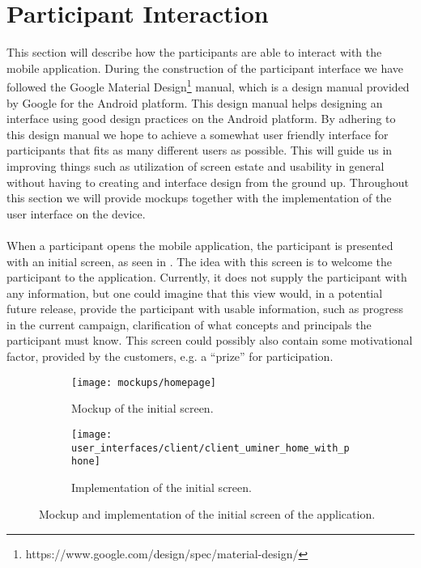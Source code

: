 
\section{Participant Interaction}
\label{sec:participant_interaction}
This section will describe how the participants are able to interact with the mobile application. During the construction of the participant interface we have followed the Google Material Design\footnote{https://www.google.com/design/spec/material-design/} manual, which is a design manual provided by Google for the Android platform. This design manual helps designing an interface using good design practices on the Android platform. By adhering to this design manual we hope to achieve a somewhat user friendly interface for participants that fits as many different users as possible. This will guide us in improving things such as utilization of screen estate and usability in general without having to creating and interface design from the ground up. Throughout this section we will provide mockups together with the implementation of the user interface on the device.
\\\\
When a participant opens the mobile application, the participant is presented with an initial screen, as seen in . The idea with this screen is to welcome the participant to the application. Currently, it does not supply the participant with any information, but one could imagine that this view would, in a potential future release, provide the participant with usable information, such as progress in the current campaign, clarification of what concepts and principals the participant must know. This screen could possibly also contain some motivational factor, provided by the customers, e.g. a ``prize'' for participation.

\begin{figure}[!htbp]
    \begin{subfigure}[!t]{.48\textwidth}
        \centering
        \texttt{[image: mockups/homepage]}
        \caption{Mockup of the initial screen.}
        \label{fig:mockup_initial_screen}
    \end{subfigure}%
    \begin{subfigure}[!t]{.52\textwidth}
    \centering
        \texttt{[image: user\_interfaces/client/client\_uminer\_home\_with\_phone]}
        \caption{Implementation of the initial screen.}
        \label{fig:implementation_initial_screen}
    \end{subfigure}
    \caption{Mockup and implementation of the initial screen of the application.}
    \label{fig:initial_screen}
\end{figure}
\FloatBarrier

